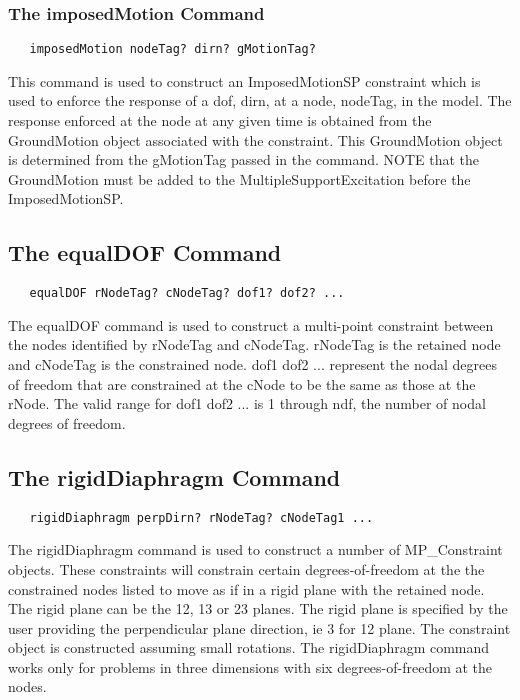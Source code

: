 \documentclass[12pt]{article}
\begin{document}
\subsubsection{The imposedMotion Command}
{\sf\small
\begin{verbatim}
   imposedMotion nodeTag? dirn? gMotionTag? 
\end{verbatim}
}

This command is used to construct an ImposedMotionSP constraint which
is used to enforce the response of a dof, dirn, at a node, nodeTag, in
the model. The response enforced at the node at any given time is
obtained from the GroundMotion object associated with the
constraint. This GroundMotion object is determined from the gMotionTag
passed in the command. NOTE that the GroundMotion must be added to the
MultipleSupportExcitation before the ImposedMotionSP. 


\subsection{The equalDOF Command}
{\sf\small
\begin{verbatim}
   equalDOF rNodeTag? cNodeTag? dof1? dof2? ...
\end{verbatim}
}

The equalDOF command is used to construct a multi-point constraint between
the nodes identified by rNodeTag and cNodeTag. rNodeTag is the retained node
and cNodeTag is the constrained node. dof1 dof2 ... 
represent the nodal degrees of freedom that are constrained at the cNode to
be the same as those at the rNode. The valid range for dof1 dof2 ... is 1
through ndf, the number of nodal degrees of freedom.

\subsection{The rigidDiaphragm Command}
{\sf\small
\begin{verbatim}
   rigidDiaphragm perpDirn? rNodeTag? cNodeTag1 ...
\end{verbatim}
}

The rigidDiaphragm command is used to construct a number of
MP\_Constraint objects. These constraints will constrain certain
degrees-of-freedom at the the constrained nodes listed to move as if in a
rigid plane with the retained node. The rigid plane can be the 12, 13 or
23 planes. The rigid plane is specified by the user providing the
perpendicular plane direction, ie 3 for 12 plane. The constraint
object is constructed assuming small rotations. The rigidDiaphragm
command works only for problems in three dimensions with six
degrees-of-freedom at the nodes. 
\end{document}

